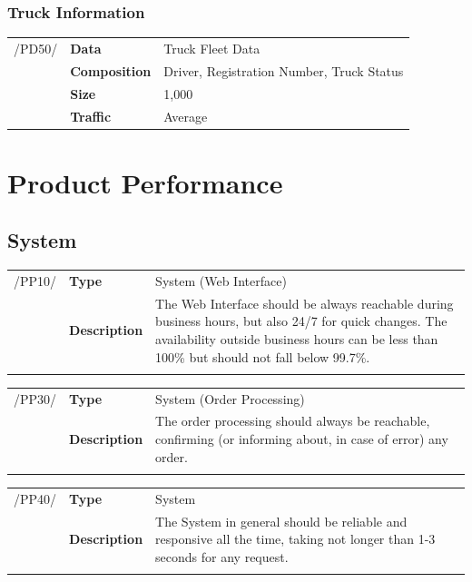\documentclass[11pt,a4paper,oneside,svgnames]{report}
\begin{document}
\subsection{Truck Information}
\begin{tabular}{llp{8.75cm}}
\cellcolor{white}/PD50/	& \textbf{Data}			& Truck Fleet Data\\
\cellcolor{white}		& \textbf{Composition}	& Driver, Registration Number, Truck Status\\
\cellcolor{white}		& \textbf{Size}		& 1,000\\
\cellcolor{white}		& \textbf{Traffic}		& Average\\
\end{tabular} 

\chapter{Product Performance}
\section{System}
\noindent
\begin{tabular}{llp{8.75cm}}
\cellcolor{white}/PP10/	& \textbf{Type}			& System (Web Interface)\\
\cellcolor{white}		& \textbf{Description}	& The Web Interface should be always reachable during business hours, but also 24/7 for quick changes. The availability outside business hours can be less than 100\% but should not fall below 99.7\%.\\
\cellcolor{white}		\hfill \\
\end{tabular}

\noindent
\begin{tabular}{llp{8.75cm}}
\cellcolor{white}/PP30/	& \textbf{Type}			& System (Order Processing)\\
\cellcolor{white}		& \textbf{Description}	& The order processing should always be reachable, confirming (or informing about, in case of error) any order.\\
\cellcolor{white}		\hfill \\
\end{tabular}

\noindent
\begin{tabular}{llp{8.75cm}}
\cellcolor{white}/PP40/	& \textbf{Type}			& System\\
\cellcolor{white}		& \textbf{Description}	& The System in general should be reliable and responsive all the time, taking not longer than 1-3 seconds for any request.\\
\cellcolor{white}		\hfill \\
\end{tabular}
\end{document}

